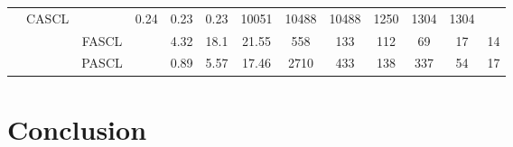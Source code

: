 \begin{table}[t]
{{\begin{tabular}{r|c|c|c c c c| c c c| c c c}
        & CASCL &                          & 0.24 & 0.23 & 0.23       & 10051 & 10488& 10488 &1250 & 1304 & 1304 \\
      & & FASCL &                          & 4.32 & 18.1 & 21.55      & 558   & 133  & 112   &69   & 17   & 14   \\
      & & PASCL &                          & 0.89 & 5.57 & 17.46      & 2710  & 433  & 138   &337  & 54   & 17   \\
    \end{tabular}
    }}
  \end{table}

 






































\section{Conclusion}
